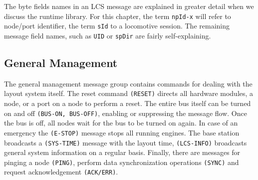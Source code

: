 The byte fields names in an LCS message are explained in greater detail when we discuss the runtime library. For this chapter, the term \texttt{npId-x} will refer to node/port identifier, the term \texttt{sId} to a locomotive session. The remaining message field names, such as \texttt{UID} or \texttt{spDir} are fairly self-explaining.

\subsection{General Management}

The general management message group contains commands for dealing with the layout system itself. The reset command \texttt{(RESET)} directs all hardware modules, a node, or a port on a node to perform a reset. The entire bus itself can be turned on and off \texttt{(BUS-ON, BUS-OFF)}, enabling or suppressing the message flow. Once the bus is off, all nodes wait for the bus to be turned on again. In case of an emergency the \texttt{(E-STOP)} message stops all running engines. The base station broadcasts a \texttt{(SYS-TIME)} message with the layout time, \texttt{(LCS-INFO)} broadcasts general system information on a regular basis. Finally, there are messages for pinging a node \texttt{(PING)}, perform data synchronization operations \texttt{(SYNC)} and request acknowledgement \texttt{(ACK/ERR)}.

\begin{table}[ht!]
    \centering 
    \caption{General Management}
\end{table}

